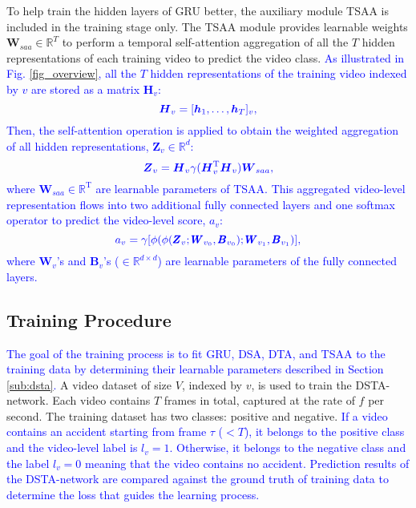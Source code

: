 \documentclass[journal]{IEEEtran}
\begin{document}
To help train the hidden layers of GRU better, the auxiliary module TSAA is included in the training stage only. The TSAA module provides learnable weights $\boldsymbol{W}_{saa}\in\mathbb{R}^{T}$ to perform a temporal self-attention aggregation \cite{vaswani2017attention} of all the $T$ hidden representations of each training video to predict the video class. \textcolor{blue}{As illustrated in Fig. \ref{fig_overview}, all the $T$ hidden representations of the training video indexed by $v$ are stored as a matrix $\pmb{H}_v$:}
\begin{equation}
    \textcolor{blue}{\boldsymbol{H}_v=[\boldsymbol{h}_{1},\dots,\boldsymbol{h}_{T}]_v,}
\end{equation}
\textcolor{blue}{Then, the self-attention operation is applied to obtain the weighted aggregation of all hidden representations, $\pmb{Z}_v\in\mathbb{R}^{d}$: }
\begin{equation}
    \textcolor{blue}{\boldsymbol{Z}_{v} = \boldsymbol{H}_v \gamma(\boldsymbol{H}^\text{T}_v \boldsymbol{H}_v) \boldsymbol{W}_{saa},}
\end{equation}
\textcolor{blue}{where $\boldsymbol{W}_{saa}\in \mathbb{R}^\text{T}$ are learnable parameters of TSAA.}
\textcolor{blue}{This aggregated video-level representation flows into two additional fully connected layers and one softmax operator to predict the video-level score, $a_v$:}
\begin{equation} 
    \textcolor{blue}{a_v = \gamma[\phi(\phi(\pmb{Z}_v;\pmb{W}_{v_0},\pmb{B}_{v_0});\pmb{W}_{v_1},\pmb{B}_{v_1})] ,
    \label{eq:av}}
\end{equation}
\textcolor{blue}{where $\pmb{W}_v$'s and $\pmb{B}_v$'s ($\in \mathbb{R}^{d\times d}$) are learnable parameters of the fully connected layers.}

\subsection{Training Procedure}
\textcolor{blue}{
The goal of the training process is to fit GRU, DSA, DTA, and TSAA to the training data by determining their learnable parameters described in Section \ref{sub:dsta}.} A video dataset of size $V$, indexed by $v$, is used to train the DSTA-network. Each video contains $T$ frames in total, captured at the rate of $f$ per second. The training dataset has two classes: positive and negative. \textcolor{blue}{If a video contains an accident starting from frame $\tau$ ($<T$), it belongs to the positive class and the video-level label is $l_v=1$. Otherwise, it belongs to the negative class and the label $l_v=0$ meaning that the video contains no accident. Prediction results of the DSTA-network are compared against the ground truth of training data to determine the loss that guides the learning process.}
\end{document}
